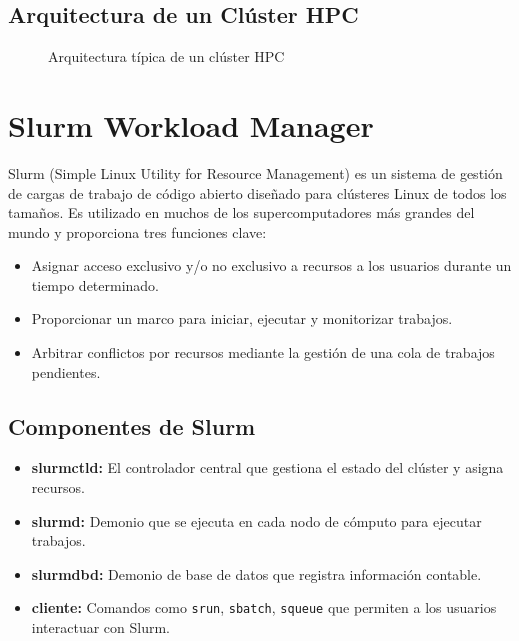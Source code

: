 \documentclass[12pt,a4paper]{report}
\begin{document}
\subsection{Arquitectura de un Clúster HPC}

\begin{figure}[H]
\centering
\caption{Arquitectura típica de un clúster HPC}
\label{fig:hpc_architecture}
\end{figure}

\section{Slurm Workload Manager}

Slurm (Simple Linux Utility for Resource Management) es un sistema de gestión de cargas de trabajo de código abierto diseñado para clústeres Linux de todos los tamaños. Es utilizado en muchos de los supercomputadores más grandes del mundo y proporciona tres funciones clave:

\begin{itemize}
    \item Asignar acceso exclusivo y/o no exclusivo a recursos a los usuarios durante un tiempo determinado.
    \item Proporcionar un marco para iniciar, ejecutar y monitorizar trabajos.
    \item Arbitrar conflictos por recursos mediante la gestión de una cola de trabajos pendientes.
\end{itemize}

\subsection{Componentes de Slurm}

\begin{itemize}
    \item \textbf{slurmctld:} El controlador central que gestiona el estado del clúster y asigna recursos.
    \item \textbf{slurmd:} Demonio que se ejecuta en cada nodo de cómputo para ejecutar trabajos.
    \item \textbf{slurmdbd:} Demonio de base de datos que registra información contable.
    \item \textbf{cliente:} Comandos como \texttt{srun}, \texttt{sbatch}, \texttt{squeue} que permiten a los usuarios interactuar con Slurm.
\end{itemize}
\end{document}
